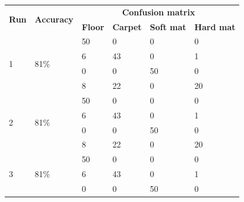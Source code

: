 \documentclass[USenglish]{ifimaster}  %
\begin{document}
	\begin{table}[h]
		\centering
		\begin{tabular}{@{}llllll@{}}
			\toprule
			\multirow{2}{*}{\textbf{Run}} & \multirow{2}{*}{\textbf{Accuracy}} & \multicolumn{4}{c}{\textbf{Confusion matrix}} \\ \cmidrule(l){3-6} 
			&  & \multicolumn{1}{l|}{\textbf{Floor}} & \multicolumn{1}{l|}{\textbf{Carpet}} & \multicolumn{1}{l|}{\textbf{Soft mat}} & \textbf{Hard mat} \\ \midrule
			\multicolumn{1}{l|}{\multirow{4}{*}{1}} & \multicolumn{1}{l|}{\multirow{4}{*}{81\%}} & \multicolumn{1}{l|}{50} & \multicolumn{1}{l|}{0} & \multicolumn{1}{l|}{0} & 0 \\ \cmidrule(l){3-6} 
			\multicolumn{1}{l|}{} & \multicolumn{1}{l|}{} & \multicolumn{1}{l|}{6} & \multicolumn{1}{l|}{43} & \multicolumn{1}{l|}{0} & 1 \\ \cmidrule(l){3-6} 
			\multicolumn{1}{l|}{} & \multicolumn{1}{l|}{} & \multicolumn{1}{l|}{0} & \multicolumn{1}{l|}{0} & \multicolumn{1}{l|}{50} & 0 \\ \cmidrule(l){3-6} 
			\multicolumn{1}{l|}{} & \multicolumn{1}{l|}{} & \multicolumn{1}{l|}{8} & \multicolumn{1}{l|}{22} & \multicolumn{1}{l|}{0} & 20 \\ \midrule
			\multicolumn{1}{l|}{\multirow{4}{*}{2}} & \multicolumn{1}{l|}{\multirow{4}{*}{81\%}} & \multicolumn{1}{l|}{50} & \multicolumn{1}{l|}{0} & \multicolumn{1}{l|}{0} & 0 \\ \cmidrule(l){3-6} 
			\multicolumn{1}{l|}{} & \multicolumn{1}{l|}{} & \multicolumn{1}{l|}{6} & \multicolumn{1}{l|}{43} & \multicolumn{1}{l|}{0} & 1 \\ \cmidrule(l){3-6} 
			\multicolumn{1}{l|}{} & \multicolumn{1}{l|}{} & \multicolumn{1}{l|}{0} & \multicolumn{1}{l|}{0} & \multicolumn{1}{l|}{50} & 0 \\ \cmidrule(l){3-6} 
			\multicolumn{1}{l|}{} & \multicolumn{1}{l|}{} & \multicolumn{1}{l|}{8} & \multicolumn{1}{l|}{22} & \multicolumn{1}{l|}{0} & 20 \\ \midrule
			\multicolumn{1}{l|}{\multirow{4}{*}{3}} & \multicolumn{1}{l|}{\multirow{4}{*}{81\%}} & \multicolumn{1}{l|}{50} & \multicolumn{1}{l|}{0} & \multicolumn{1}{l|}{0} & 0 \\ \cmidrule(l){3-6} 
			\multicolumn{1}{l|}{} & \multicolumn{1}{l|}{} & \multicolumn{1}{l|}{6} & \multicolumn{1}{l|}{43} & \multicolumn{1}{l|}{0} & 1 \\ \cmidrule(l){3-6} 
			\multicolumn{1}{l|}{} & \multicolumn{1}{l|}{} & \multicolumn{1}{l|}{0} & \multicolumn{1}{l|}{0} & \multicolumn{1}{l|}{50} & 0 \\ \cmidrule(l){3-6} 

\end{tabular}
\end{table}
\end{document}
